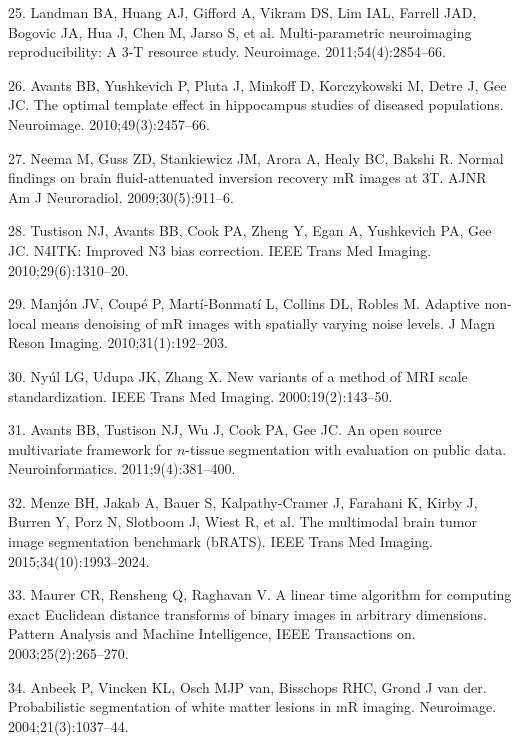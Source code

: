 \documentclass[11pt,]{article}
\begin{document}
\hypertarget{ref-landman2011}{}
25. Landman BA, Huang AJ, Gifford A, Vikram DS, Lim IAL, Farrell JAD,
Bogovic JA, Hua J, Chen M, Jarso S, et al. Multi-parametric neuroimaging
reproducibility: A 3-T resource study. Neuroimage. 2011;54(4):2854--66.

\hypertarget{ref-Avants:2010aa}{}
26. Avants BB, Yushkevich P, Pluta J, Minkoff D, Korczykowski M, Detre
J, Gee JC. The optimal template effect in hippocampus studies of
diseased populations. Neuroimage. 2010;49(3):2457--66.

\hypertarget{ref-Neema:2009aa}{}
27. Neema M, Guss ZD, Stankiewicz JM, Arora A, Healy BC, Bakshi R.
Normal findings on brain fluid-attenuated inversion recovery mR images
at 3T. AJNR Am J Neuroradiol. 2009;30(5):911--6.

\hypertarget{ref-Tustison:2010ac}{}
28. Tustison NJ, Avants BB, Cook PA, Zheng Y, Egan A, Yushkevich PA, Gee
JC. N4ITK: Improved N3 bias correction. IEEE Trans Med Imaging.
2010;29(6):1310--20.

\hypertarget{ref-Manjon:2010aa}{}
29. Manjón JV, Coupé P, Martí-Bonmatí L, Collins DL, Robles M. Adaptive
non-local means denoising of mR images with spatially varying noise
levels. J Magn Reson Imaging. 2010;31(1):192--203.

\hypertarget{ref-nyul2000}{}
30. Nyúl LG, Udupa JK, Zhang X. New variants of a method of MRI scale
standardization. IEEE Trans Med Imaging. 2000;19(2):143--50.

\hypertarget{ref-Avants:2011aa}{}
31. Avants BB, Tustison NJ, Wu J, Cook PA, Gee JC. An open source
multivariate framework for \(n\)-tissue segmentation with evaluation on
public data. Neuroinformatics. 2011;9(4):381--400.

\hypertarget{ref-Menze:2015aa}{}
32. Menze BH, Jakab A, Bauer S, Kalpathy-Cramer J, Farahani K, Kirby J,
Burren Y, Porz N, Slotboom J, Wiest R, et al. The multimodal brain tumor
image segmentation benchmark (bRATS). IEEE Trans Med Imaging.
2015;34(10):1993--2024.

\hypertarget{ref-maurer2003}{}
33. Maurer CR, Rensheng Q, Raghavan V. A linear time algorithm for
computing exact Euclidean distance transforms of binary images in
arbitrary dimensions. Pattern Analysis and Machine Intelligence, IEEE
Transactions on. 2003;25(2):265--270.

\hypertarget{ref-Anbeek:2004aa}{}
34. Anbeek P, Vincken KL, Osch MJP van, Bisschops RHC, Grond J van der.
Probabilistic segmentation of white matter lesions in mR imaging.
Neuroimage. 2004;21(3):1037--44.
\end{document}
